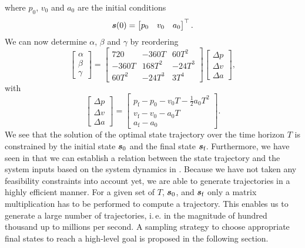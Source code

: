where $p_0$, $v_0$ and $a_0$ are the initial conditions 
\begin{equation}
	\mbox{$\bm{s}$}(0) = 
	\begin{bmatrix}
		p_0 & v_0 & a_0
	\end{bmatrix}^\top
	.
\end{equation}
We can now determine $\alpha$, $\beta$ and $\gamma$ by reordering 
\begin{equation}
	\label{eq:trajectory-coefficients}
	\begin{bmatrix}
		\alpha \\
		\beta \\
		\gamma
	\end{bmatrix}
	=
	\begin{bmatrix}
		720 & -360T & 60T^2 \\
		-360T & 168T^2 & -24T^3 \\
		60T^2 & -24T^3 & 3T^4

	\end{bmatrix}
	\begin{bmatrix}
		\Delta p \\
		\Delta v \\
		\Delta a
	\end{bmatrix}
	,
\end{equation}
with
\begin{equation}
	\label{eq:trajectory-delta-state}
	\begin{bmatrix}
		\Delta p \\
		\Delta v \\
		\Delta a
	\end{bmatrix}
	= 
	\begin{bmatrix}
		p_\text{f} - p_0 - v_0 T - \frac{1}{2}a_0 T^2 \\
		v_\text{f} - v_0 - a_0 T \\
		a_\text{f} - a_0
	\end{bmatrix}
	.
\end{equation}
We see that the solution of the optimal state trajectory over the time horizon $T$ is constrained by the initial state $\mbox{$\bm{s}$}_0$ and the final state $\mbox{$\bm{s}$}_\text{f}$. Furthermore, we have seen in  that we can establish a relation between the state trajectory and the system inputs based on the system dynamics in . Because we have not taken any feasibility constraints into account yet, we are able to generate trajectories in a highly efficient manner. For a given set of $T$, $\mbox{$\bm{s}$}_0$, and $\mbox{$\bm{s}$}_\text{f}$ only a matrix multiplication has to be performed to compute a trajectory. This enables us to generate a large number of trajectories, i.\,e. in the magnitude of hundred thousand up to millions per second. A sampling strategy to choose appropriate final states to reach a high-level goal is proposed in the following section.

